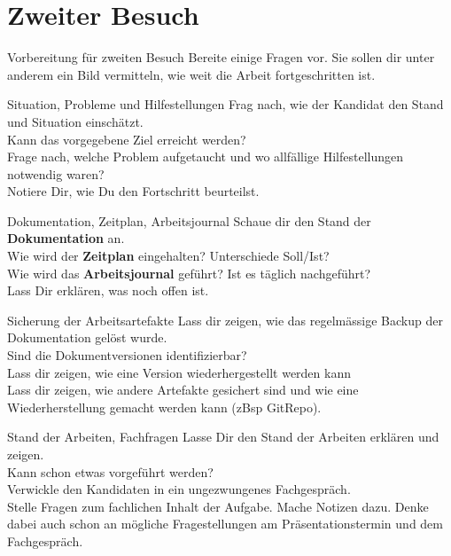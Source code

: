 \section{Zweiter Besuch}
\begin{taskitem}{Vorbereitung für zweiten Besuch}
  Bereite einige Fragen vor. Sie sollen dir unter anderem ein Bild vermitteln, wie weit die Arbeit fortgeschritten ist.
\end{taskitem}
\begin{taskitem}{Situation, Probleme und Hilfestellungen}
  Frag nach, wie der Kandidat den Stand und Situation einschätzt.\\Kann das vorgegebene Ziel erreicht werden?\\Frage nach, welche Problem aufgetaucht und wo allfällige Hilfestellungen notwendig waren?\\Notiere Dir, wie Du den Fortschritt beurteilst.
\end{taskitem}
\begin{taskitem}{Dokumentation, Zeitplan, Arbeitsjournal}
  Schaue dir den Stand der \textbf{Dokumentation} an.\\
  Wie wird der \textbf{Zeitplan} eingehalten? Unterschiede Soll/Ist?\\Wie wird das \textbf{Arbeitsjournal} geführt? Ist es täglich nachgeführt?\\Lass Dir erklären, was noch offen ist.
\end{taskitem}
\newpage
\begin{taskitem}{Sicherung der Arbeitsartefakte}
  Lass dir zeigen, wie das regelmässige Backup der Dokumentation gelöst wurde.\\Sind die Dokumentversionen identifizierbar?\\Lass dir zeigen, wie eine Version wiederhergestellt werden kann\\Lass dir zeigen, wie andere Artefakte gesichert sind und wie eine Wiederherstellung gemacht werden kann (zBsp GitRepo).
\end{taskitem}
\begin{taskitem}{Stand der Arbeiten, Fachfragen}
  Lasse Dir den Stand der Arbeiten erklären und zeigen.\\Kann schon etwas vorgeführt werden?\\Verwickle den Kandidaten in ein ungezwungenes Fachgespräch.\\Stelle Fragen zum fachlichen Inhalt der Aufgabe. Mache Notizen dazu. Denke dabei auch schon an mögliche Fragestellungen am Präsentationstermin und dem Fachgespräch.
\end{taskitem}
